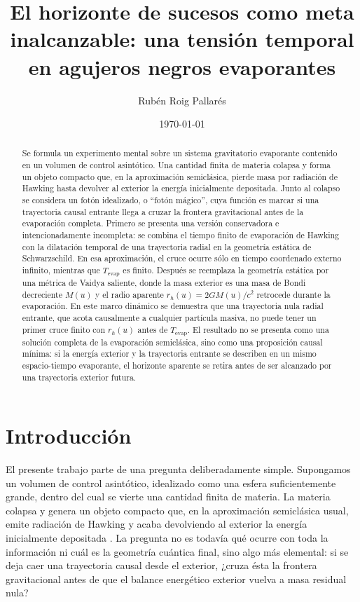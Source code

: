 \documentclass[
aps,
prd,
reprint,
superscriptaddress,
nofootinbib,
amsmath,
amssymb
]{revtex4-2}
\begin{document}
\title{El horizonte de sucesos como meta inalcanzable: una tensión temporal en agujeros negros evaporantes}

\author{Rubén Roig Pallarés}

\date{\today}

\begin{abstract}
Se formula un experimento mental sobre un sistema gravitatorio evaporante contenido en un volumen de control asintótico. Una cantidad finita de materia colapsa y forma un objeto compacto que, en la aproximación semiclásica, pierde masa por radiación de Hawking hasta devolver al exterior la energía inicialmente depositada. Junto al colapso se considera un fotón idealizado, o ``fotón mágico'', cuya función es marcar si una trayectoria causal entrante llega a cruzar la frontera gravitacional antes de la evaporación completa. Primero se presenta una versión conservadora e intencionadamente incompleta: se combina el tiempo finito de evaporación de Hawking con la dilatación temporal de una trayectoria radial en la geometría estática de Schwarzschild. En esa aproximación, el cruce ocurre sólo en tiempo coordenado externo infinito, mientras que $T_{\mathrm{evap}}$ es finito. Después se reemplaza la geometría estática por una métrica de Vaidya saliente, donde la masa exterior es una masa de Bondi decreciente $M(u)$ y el radio aparente $r_h(u)=2GM(u)/c^2$ retrocede durante la evaporación. En este marco dinámico se demuestra que una trayectoria nula radial entrante, que acota causalmente a cualquier partícula masiva, no puede tener un primer cruce finito con $r_h(u)$ antes de $T_{\mathrm{evap}}$. El resultado no se presenta como una solución completa de la evaporación semiclásica, sino como una proposición causal mínima: si la energía exterior y la trayectoria entrante se describen en un mismo espacio-tiempo evaporante, el horizonte aparente se retira antes de ser alcanzado por una trayectoria exterior futura.
\end{abstract}

\maketitle

\section{Introducción}

El presente trabajo parte de una pregunta deliberadamente simple. Supongamos un volumen de control asintótico, idealizado como una esfera suficientemente grande, dentro del cual se vierte una cantidad finita de materia. La materia colapsa y genera un objeto compacto que, en la aproximación semiclásica usual, emite radiación de Hawking y acaba devolviendo al exterior la energía inicialmente depositada \cite{Hawking1974,Hawking1975,Page1976}. La pregunta no es todavía qué ocurre con toda la información ni cuál es la geometría cuántica final, sino algo más elemental: si se deja caer una trayectoria causal desde el exterior, ¿cruza ésta la frontera gravitacional antes de que el balance energético exterior vuelva a masa residual nula?
\end{document}
